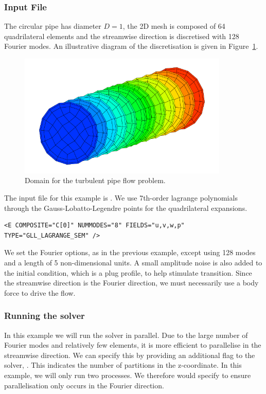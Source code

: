 \subsubsection{Input File}
The circular pipe has diameter $D=1$, the 2D mesh is composed of 64
quadrilateral elements and the streamwise direction is discretised with 128
Fourier modes. An illustrative diagram of the discretisation is given in
Figure~\ref{f:incns:turbpipemesh}.

\begin{figure}
\begin{center}
\includegraphics[width=10cm]{Figures/PipeDomain.png}
\caption{Domain for the turbulent pipe flow problem.}
\label{f:incns:turbpipemesh}
\end{center}
\end{figure}

The input file for this example is . We use 7th-order
lagrange polynomials through the Gauss-Lobatto-Legendre points for the
quadrilateral expansions.
\begin{lstlisting}[style=XMLStyle]
<E COMPOSITE="C[0]" NUMMODES="8" FIELDS="u,v,w,p" TYPE="GLL_LAGRANGE_SEM" />
\end{lstlisting}
We set the Fourier options, as in the previous example, except using 128
modes and a length of 5 non-dimensional units. A small amplitude noise is also
added to the initial condition, which is a plug profile, to help stimulate
transition. Since the streamwise direction is the Fourier direction, we must
necessarily use a body force to drive the flow.

\subsubsection{Running the solver}
In this example we will run the solver in parallel. Due to the large number of
Fourier modes and relatively few elements, it is more efficient to parallelise
in the streamwise direction. We can specify this by providing an additional flag
to the solver, . This indicates the number of partitions in the
z-coordinate. In this example, we will only run two processes. We therefore
would specify  to ensure parallelisation only occurs in the
Fourier direction.

